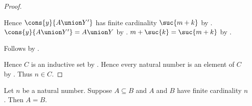 \begin{proof}
\begin{subproof}
\begin{subproof}
            Hence $\cons{y}{A\union Y'}$ has finite cardinality
                $\suc{m+k}$ by
                .
            $\cons{y}{A\union Y'}=A\union Y$ by
                .
            $m+\suc{k}=\suc{m+k}$ by
                .
        \end{subproof}
        Follows by .
    \end{subproof}
    Hence $C$ is an inductive set by .
    Hence every natural number is an element of $C$ by
        .
    Thus $n\in C$.
\end{proof}

\begin{theorem}\label{finite_subset_same_cardinality}
    Let $n$ be a natural number.
    Suppose $A\subseteq B$ and $A$ and $B$ have finite cardinality $n$.
    Then $A=B$.
\end{theorem}
